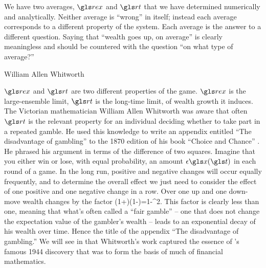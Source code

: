 We have two averages, $\rex$ and $\rt$ that we have determined numerically and analytically. 
Neither average is ``wrong'' in itself; instead each average corresponds to a different property
of the system. Each average is the answer to a different question. Saying that ``wealth 
goes up, on average'' is clearly meaningless and should be countered with the question 
``on what type of average?'' 


\begin{history}{William Allen Whitworth}

$\rex$ and $\rt$ are two different properties of the game. $\rex$ is 
the large-ensemble limit, $\rt$ is the long-time limit, of wealth growth it induces. The Victorian 
mathematician William Allen Whitworth was aware that often $\rt$ is the relevant property 
for an individual deciding whether to take part in a repeated gamble. 
He used this knowledge to write an appendix  entitled ``The disadvantage 
of gambling'' to the 1870 edition of his book ``Choice and Chance'' 
\cite{Whitworth1870}. He phrased his argument in terms of the difference of two squares. 
Imagine that you either win or lose, with equal probability, 
an amount $\epsilon \x(\t)$ in each round of a game. In the long run, positive and 
negative changes will occur equally frequently, and to determine
the overall effect we just need to consider the effect of one positive and one negative change
in a row. Over one up and one down-move wealth changes by the factor
\be
(1+\epsilon)(1-\epsilon)=1-\epsilon^2.
\ee
This factor is clearly less than one, meaning that what's often called a ``fair gamble'' -- one 
that does not change the expectation value of the gambler's wealth -- leads to an 
exponential decay of his wealth over time. Hence the title of the appendix 
``The disadvantage of gambling.'' We will see in  that Whitworth's work
captured the essence of \Ito's famous 1944 discovery \cite{Ito1944} that was to form the basis of
much of financial mathematics.


\end{history}
